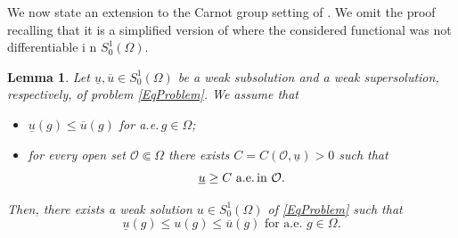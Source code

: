 \documentclass[11pt]{amsart}
\numberwithin{equation}{section} %
\newtheorem{teo}{Theorem}[section]
\newtheorem{prop}[teo]{Proposition}
\newtheorem{lemma}[teo]{Lemma}
\theoremstyle{definition}
\def\Oo{\mathcal O}
\def\G{\mathbb{G}}
\newcommand{\m}{\mbox}
\newcommand{\de}{\partial}
\begin{document}
			
			
%			
%				
%			

We now state an extension to the Carnot group setting of \cite[Theorem 2.4]{Struwe}. We omit the proof recalling that it is a simplified version of \cite[Lemma 3.4]{BiGaVe} where the considered functional was not differentiable i n $S_{0}^{1}(\Omega)$.

\begin{lemma}\label{lem:Perron}
	Let $\underline{u}, \overline{u}\in S^{1}_{0}(\Omega)$ be a weak subsolution and a weak supersolution, respectively, of problem \eqref{EqProblem}. 
	We assume that 
	\begin{itemize}
		\item[a)] $\underline{u}(g) \leq \overline{u}(g)$ for a.e.\,$g\in \Omega$;
		\item[b)] for every open set $\Oo\Subset\Omega$ there exists
		$C = C(\Oo,\underline{u}) > 0$ such that
		$$\text{$\underline{u}\geq C$ a.e.\,in $\Oo$}.$$
	\end{itemize}
	Then, there exists a weak solution $u \in S^{1}_{0}(\Omega)$ of \eqref{EqProblem} such that 
	$$\text{$\underline{u}(g) \leq u(g) \leq \overline{u}(g)$ for a.e. $g \in \Omega$}.$$
\end{lemma}
\end{document}
